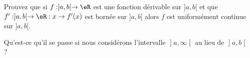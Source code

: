 
\begin{exercice}\label{exo0091}

Prouvez que si $f:]a,b[ \rightarrow \eR$ est une fonction dérivable sur $]a,b[$ et que $f': ]a,b[ \rightarrow  \eR: x \rightarrow f'(x)$ est bornée sur $]a,b[$ alors $f$ est uniformément continue sur $]a,b[$.

Qu'est-ce qu'il se passe si nous considérons l'intervalle $\mathopen]a,\infty\mathclose[$ au lieu de $\mathopen]a,b\mathclose[$ ?

\end{exercice}

